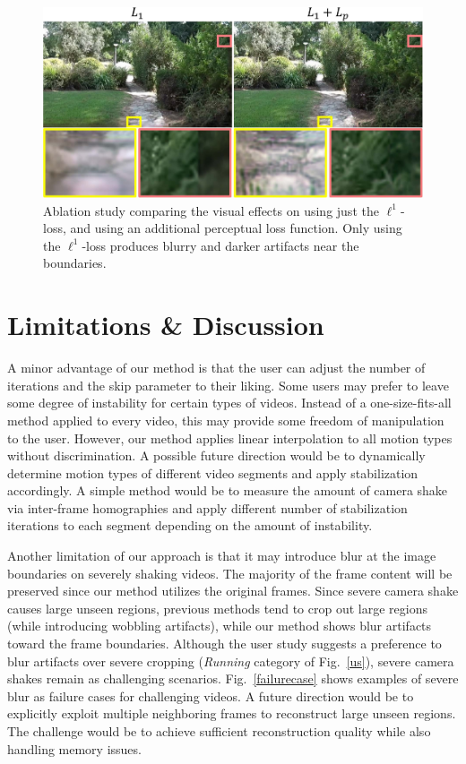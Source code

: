\begin{figure}
	\includegraphics[width=1\linewidth,keepaspectratio]{ablation}
	\vspace{-5mm}
	\caption{Ablation study comparing the visual effects on using just the $\ell^1$-loss, and using an additional perceptual loss function.
	Only using the $\ell^1$-loss produces blurry and darker artifacts near the boundaries.}
	\label{ablation}
	\vspace{-3mm}
\end{figure}



\section{Limitations \& Discussion}
A minor advantage of our method is that the user can adjust the number of iterations and the skip parameter to their liking.
Some users may prefer to leave some degree of instability for certain types of videos.
Instead of a one-size-fits-all method applied to every video, this may provide some freedom of manipulation to the user.
However, our method applies linear interpolation to all motion types without discrimination.
A possible future direction would be to dynamically determine motion types of different video segments and apply stabilization accordingly.
A simple method would be to measure the amount of camera shake via inter-frame homographies and apply different number of stabilization iterations to each segment depending on the amount of instability.

Another limitation of our approach is that it may introduce blur at the image boundaries on severely shaking videos.
The majority of the frame content will be preserved since our method utilizes the original frames.
Since severe camera shake causes large unseen regions, previous methods tend to crop out large regions (while introducing wobbling artifacts), while our method shows blur artifacts toward the frame boundaries.
Although the user study suggests a preference to blur artifacts over severe cropping (\emph{Running} category of Fig.~\ref{us}), severe camera shakes remain as challenging scenarios.
Fig.~\ref{failurecase} shows examples of severe blur as failure cases for challenging videos.
A future direction would be to explicitly exploit multiple neighboring frames to reconstruct large unseen regions.
The challenge would be to achieve sufficient reconstruction quality while also handling memory issues.

